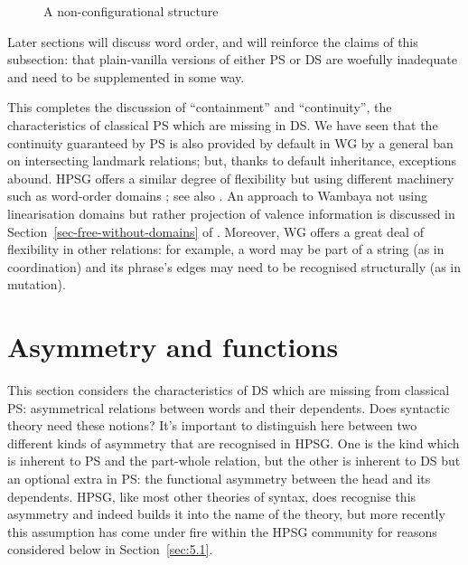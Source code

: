 \documentclass[output=paper
 	        ,biblatex
                ,babelshorthands
                ,newtxmath
                ,draftmode
                ,colorlinks, citecolor=brown
]{langscibook}
\begin{document}
\begin{figure}
	\caption{A non-configurational structure}
	\label{fig:13}
\end{figure}

Later sections will discuss word order, and will reinforce the claims of this subsection: that
plain-vanilla versions of either PS or DS are woefully inadequate and need to be supplemented in
some way.

This completes the discussion of ``containment'' and ``continuity'', the characteristics of
classical PS which are missing in DS. We have seen that the continuity guaranteed by PS is also
provided by default in WG by a general ban on intersecting landmark relations; but, thanks to
default inheritance, exceptions abound. HPSG offers a similar degree of flexibility but using
different machinery such as word-order domains \citep{Reape94a}; see also
. An approach to Wambaya not using linearisation domains but rather
projection of valence information is discussed in Section~\ref{sec-free-without-domains} of . Moreover, WG offers a great deal of flexibility in other relations: for
example, a word may be part of a string (as in coordination) and its phrase's edges may need to be
recognised structurally (as in  mutation).


\section{Asymmetry and functions}
\label{sec:5}

This section considers the characteristics of DS which are missing from classical PS: asymmetrical relations between words and their dependents. Does syntactic theory need these notions? It's important to distinguish here between two different kinds of asymmetry that are recognised in HPSG. One is the kind which is inherent to PS and the part-whole relation, but the other is inherent to DS but an optional extra in PS: the functional asymmetry between the head and its dependents. HPSG, like most other theories of syntax, does recognise this asymmetry and indeed builds it into the name of the theory, but more recently this assumption has come under fire within the HPSG community for reasons considered below in Section~\ref{sec:5.1}.
\end{document}

